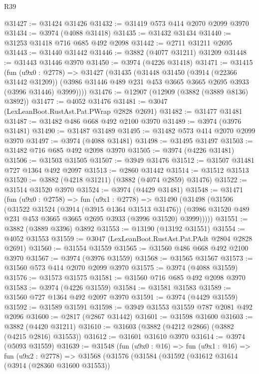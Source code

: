 \begin{lexlean}{R39}
\begin{coremodule}
@31427 := @31424 @31426
@31432 := @31419 @573 @414 @2070 @2099 @3970
@31434 := @3974 (@4088 @31418)
@31435 := @31432 @31434
@31440 := @31253 @31418 @716 @685 @492 @2098
@31442 := @2711 @31211 @2695
@31443 := @31440 @31442
@31446 := @3882 (@4077 @31211) @31209
@31448 := @31443 @31446 @3970
@31450 := @3974 (@4226 @31418)
@31471 := @31415
    (fun (u9x0 : @2778) =>
    @31427
      (@31435
        (@31448
          @31450
          (@3914 (@22366 @31442 @31209))
          (@3986 @31446 @489 @231 @453 @3665 @3665 @2695 @3933 (@3996 @31446) @3999))))
@31476 := @12907 (@12909 (@3882 (@3889 @8136) @3892))
@31477 := @4052 @31476
@31481 := @3047 (LexLeanBoot.RustAst.Pat.PWrap @2828 @2691)
@31482 := @31477 @31481
@31487 := @31482 @486 @668 @492 @2100 @3970
@31489 := @3974 (@3976 @31481)
@31490 := @31487 @31489
@31495 := @31482 @573 @414 @2070 @2099 @3970
@31497 := @3974 (@4088 @31481)
@31498 := @31495 @31497
@31503 := @31482 @716 @685 @492 @2098 @3970
@31505 := @3974 (@4226 @31481)
@31506 := @31503 @31505
@31507 := @3949 @31476
@31512 := @31507 @31481 @727 @1364 @492 @2097
@31513 := @2860 @31442
@31514 := @31512 @31513
@31520 := @3882 (@4218 @31211) (@3882 (@4074 @2859) @31476)
@31522 := @31514 @31520 @3970
@31524 := @3974 (@4429 @31481)
@31548 := @31471
    (fun (u9x0 : @2758) =>
    fun (u9x1 : @2778) =>
    @31490
      (@31498
        (@31506
          (@31522
            @31524
            (@3914 (@3915 @1364 @31513 @31476))
            (@3986 @31520 @489 @231 @453 @3665 @3665 @2695 @3933 (@3996 @31520) @3999)))))
@31551 := @3882 (@3889 @3396) @3892
@31553 := @13190 (@13192 @31551)
@31554 := @4052 @31553
@31559 := @3047 (LexLeanBoot.RustAst.Pat.PAdt @2804 @2828 @2691)
@31560 := @31554 @31559
@31565 := @31560 @486 @668 @492 @2100 @3970
@31567 := @3974 (@3976 @31559)
@31568 := @31565 @31567
@31573 := @31560 @573 @414 @2070 @2099 @3970
@31575 := @3974 (@4088 @31559)
@31576 := @31573 @31575
@31581 := @31560 @716 @685 @492 @2098 @3970
@31583 := @3974 (@4226 @31559)
@31584 := @31581 @31583
@31589 := @31560 @727 @1364 @492 @2097 @3970
@31591 := @3974 (@4429 @31559)
@31592 := @31589 @31591
@31598 := @3949 @31553 @31559 @787 @2081 @492 @2096
@31600 := @2817 (@2867 @31442)
@31601 := @31598 @31600
@31603 := @3882 (@4420 @31211)
@31610 := @31603 (@3882 (@4212 @2866) (@3882 (@4215 @2816) @31553))
@31612 := @31601 @31610 @3970
@31614 := @3974 (@5093 @31559)
@31639 := @31548
    (fun (u9x0 : @16) =>
    fun (u9x1 : @16) =>
    fun (u9x2 : @2778) =>
    @31568
      (@31576
        (@31584
          (@31592
            (@31612
              @31614
              (@3914 (@28360 @31600 @31553))

\end{coremodule}
\end{lexlean}
